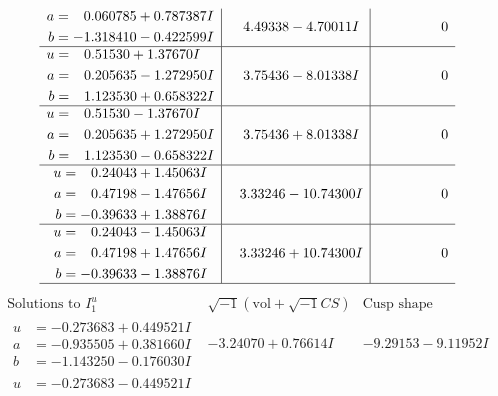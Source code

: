 \documentclass[1p]{elsarticle_modified}
\theoremstyle{definition}
\newcommand{\I}{\sqrt{-1}}
\begin{document}
$$\begin{array}{c|c|c}
\begin{aligned}
a &= \phantom{-}0.060785 + 0.787387 I \\
b &= -1.318410 - 0.422599 I\end{aligned}
 & \phantom{-}4.49338 - 4.70011 I & \phantom{-0.000000 } 0 \\ \hline\begin{aligned}
u &= \phantom{-}0.51530 + 1.37670 I \\
a &= \phantom{-}0.205635 - 1.272950 I \\
b &= \phantom{-}1.123530 + 0.658322 I\end{aligned}
 & \phantom{-}3.75436 - 8.01338 I & \phantom{-0.000000 } 0 \\ \hline\begin{aligned}
u &= \phantom{-}0.51530 - 1.37670 I \\
a &= \phantom{-}0.205635 + 1.272950 I \\
b &= \phantom{-}1.123530 - 0.658322 I\end{aligned}
 & \phantom{-}3.75436 + 8.01338 I & \phantom{-0.000000 } 0 \\ \hline\begin{aligned}
u &= \phantom{-}0.24043 + 1.45063 I \\
a &= \phantom{-}0.47198 - 1.47656 I \\
b &= -0.39633 + 1.38876 I\end{aligned}
 & \phantom{-}3.33246 - 10.74300 I & \phantom{-0.000000 } 0 \\ \hline\begin{aligned}
u &= \phantom{-}0.24043 - 1.45063 I \\
a &= \phantom{-}0.47198 + 1.47656 I \\
b &= -0.39633 - 1.38876 I\end{aligned}
 & \phantom{-}3.33246 + 10.74300 I & \phantom{-0.000000 } 0\\
 \hline 
 \end{array}$$\newpage$$\begin{array}{c|c|c}  
\text{Solutions to }I^u_{1}& \I (\text{vol} + \sqrt{-1}CS) & \text{Cusp shape}\\
 \hline 
\begin{aligned}
u &= -0.273683 + 0.449521 I \\
a &= -0.935505 + 0.381660 I \\
b &= -1.143250 - 0.176030 I\end{aligned}
 & -3.24070 + 0.76614 I & -9.29153 - 9.11952 I \\ \hline\begin{aligned}
u &= -0.273683 - 0.449521 I \\

\end{aligned}
\end{array}$$
\end{document}
